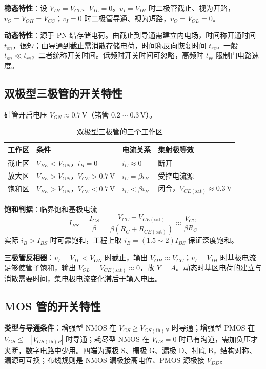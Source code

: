 \textbf{稳态特性}：设 \(V_{IH}=V_{CC}\)、\(V_{IL}=0\)。\(v_I=V_{IH}\) 时二极管截止、视为开路，\(v_O=V_{OH}=V_{CC}\)；\(v_I=0\) 时二极管导通、视为短路，\(v_O=V_{OL}=0\)。

\textbf{动态特性}：源于 PN 结存储电荷。由截止到导通需建立内电场，时间称开通时间 \(t_{on}\)，很短；由导通到截止需消散存储电荷，时间称反向恢复时间 \(t_{re}\)。一般 \(t_{on}\ll t_{re}\)，二者统称开关时间。低频时开关时间可忽略，高频时 \(t_{re}\) 限制门电路速度。

\subsection{双极型三极管的开关特性}
硅管开启电压 \(V_{ON}\approx0.7\,\mathrm{V}\)（锗管 \(0.2\sim0.3\,\mathrm{V}\)）。

\begin{table}[!htbp]
    \centering
    \caption{双极型三极管的三个工作区}
    \begin{tabular}{llll}
        \toprule
        工作区 & 条件 & 电流关系 & 集射极等效 \\
        \midrule
        截止区 & \(V_{BE}<V_{ON}\)，\(i_B=0\) & \(i_C\approx0\) & 断开 \\
        放大区 & \(V_{BE}>V_{ON}\)，\(V_{CE}>0.7\,\mathrm{V}\) & \(i_C=\beta i_B\) & 受控电流源 \\
        饱和区 & \(V_{BE}>V_{ON}\)，\(V_{CE}<0.7\,\mathrm{V}\) & \(i_C<\beta i_B\) & 闭合，\(V_{CE(\mathrm{sat})}\approx0.3\,\mathrm{V}\) \\
        \bottomrule
    \end{tabular}
\end{table}

\textbf{饱和判据}：临界饱和基极电流
\[
I_{BS}=\frac{I_{CS}}{\beta}=\frac{V_{CC}-V_{CE(\mathrm{sat})}}{\beta\left(R_C+R_{CE(\mathrm{sat})}\right)}\approx\frac{V_{CC}}{\beta R_C}
\]
实际 \(i_B>I_{BS}\) 时可靠饱和，工程上取 \(i_B=(1.5\sim2)I_{BS}\) 保证深度饱和。

\textbf{三极管反相器}：\(v_I=V_{IL}<V_{ON}\) 时截止，输出 \(V_{OH}\approx V_{CC}\)；\(v_I=V_{IH}\) 时基极电流足够使管子饱和，输出 \(V_{OL}=V_{CE(\mathrm{sat})}\approx0\)，故 \(Y=\overline{A}\)。动态时基区电荷的建立与消散需要时间，集电极电流变化滞后于输入电压。

\subsection{MOS 管的开关特性}
\textbf{类型与导通条件}：增强型 NMOS 在 \(V_{GS}\ge V_{GS(\mathrm{th})N}\) 时导通；增强型 PMOS 在 \(V_{GS}\le-|V_{GS(\mathrm{th})P}|\) 时导通；耗尽型 NMOS 在 \(V_{GS}=0\) 时已有沟道，需加负压才夹断，数字电路中少用。四端为源极 S、栅极 G、漏极 D、衬底 B，结构对称、漏源可互换；布线规则是 NMOS 漏极接高电位、PMOS 源极接 \(V_{DD}\)。

